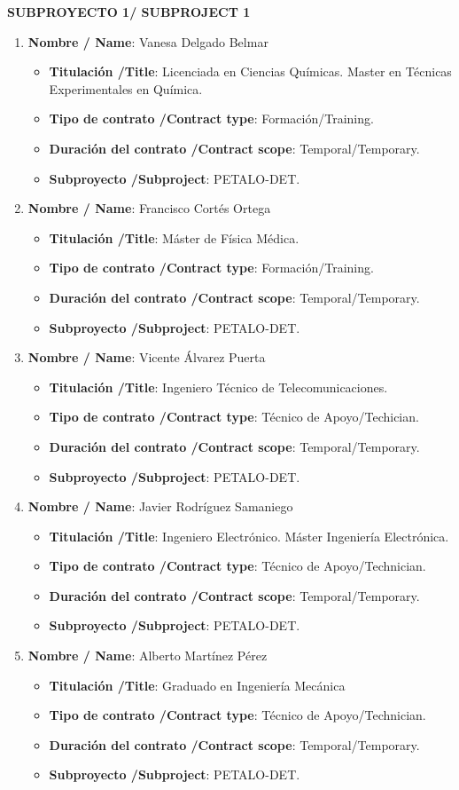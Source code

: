 \noindent\textbf{SUBPROYECTO 1/ SUBPROJECT 1}
\begin{enumerate}
\item {\bf Nombre / Name}: Vanesa Delgado Belmar
\begin{itemize}
\item {\bf Titulación /Title}:  Licenciada en Ciencias Químicas. Master en Técnicas Experimentales en Química.
\item {\bf Tipo de contrato /Contract type}: Formación/Training. 
\item {\bf Duración del contrato /Contract scope}: Temporal/Temporary. 
\item {\bf Subproyecto /Subproject}: PETALO-DET. 
\end{itemize}
\item {\bf Nombre / Name}: Francisco Cortés Ortega
\begin{itemize}
\item {\bf Titulación /Title}: Máster de Física Médica. 
\item {\bf Tipo de contrato /Contract type}: Formación/Training. 
\item {\bf Duración del contrato /Contract scope}: Temporal/Temporary. 
\item {\bf Subproyecto /Subproject}: PETALO-DET. 
\end{itemize}
\item {\bf Nombre / Name}: Vicente Álvarez Puerta
\begin{itemize}
\item {\bf Titulación /Title}: Ingeniero Técnico de Telecomunicaciones. 
\item {\bf Tipo de contrato /Contract type}: Técnico de Apoyo/Techician. 
\item {\bf Duración del contrato /Contract scope}: Temporal/Temporary. 
\item {\bf Subproyecto /Subproject}: PETALO-DET. 
\end{itemize}
\item {\bf Nombre / Name}: Javier Rodríguez Samaniego
\begin{itemize}
\item {\bf Titulación /Title}: Ingeniero Electrónico. Máster Ingeniería Electrónica.
\item {\bf Tipo de contrato /Contract type}: Técnico de Apoyo/Technician. 
\item {\bf Duración del contrato /Contract scope}: Temporal/Temporary. 
\item {\bf Subproyecto /Subproject}: PETALO-DET. 
\end{itemize}
\item {\bf Nombre / Name}: Alberto Martínez Pérez
\begin{itemize}
\item {\bf Titulación /Title}: Graduado en Ingeniería Mecánica 
\item {\bf Tipo de contrato /Contract type}: Técnico de Apoyo/Technician.
\item {\bf Duración del contrato /Contract scope}: Temporal/Temporary. 
\item {\bf Subproyecto /Subproject}: PETALO-DET. 
\end{itemize}

\end{enumerate}
